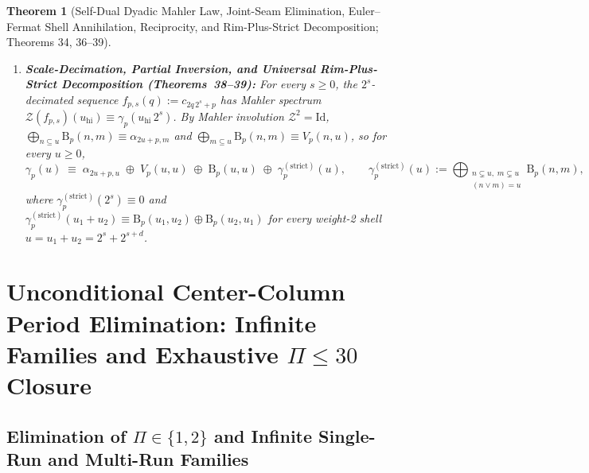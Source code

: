 \documentclass[11pt,a4paper]{article}
\newtheorem{theorem}{Theorem}[section]
\theoremstyle{definition}
\theoremstyle{remark}
\begin{document}
\begin{theorem}[Self-Dual Dyadic Mahler Law, Joint-Seam Elimination, Euler--Fermat Shell Annihilation, Reciprocity, and Rim-Plus-Strict Decomposition; Theorems 34, 36--39]
\begin{enumerate}
  \item \textbf{Scale-Decimation, Partial Inversion, and Universal Rim-Plus-Strict Decomposition (Theorems~38--39):} For every $s \ge 0$, the $2^s$-decimated sequence $f_{p,s}(q) := c_{2q\,2^s + p}$ has Mahler spectrum $\mathcal{Z}(f_{p,s})(u_{\mathrm{hi}}) \equiv \gamma_p(u_{\mathrm{hi}}\,2^s)$. By Mahler involution $\mathcal{Z}^2 = \mathrm{Id}$, $\bigoplus_{n \subseteq u} \mathrm{B}_p(n,m) \equiv \alpha_{2u+p,m}$ and $\bigoplus_{m \subseteq u} \mathrm{B}_p(n,m) \equiv V_p(n,u)$, so for every $u \ge 0$,
  \begin{equation}
    \gamma_p(u) \;\equiv\; \alpha_{2u+p, u} \;\oplus\; V_p(u, u) \;\oplus\; \mathrm{B}_p(u, u) \;\oplus\; \gamma_p^{(\mathrm{strict})}(u), \qquad
    \gamma_p^{(\mathrm{strict})}(u) := \bigoplus_{\substack{n \subsetneq u,\; m \subsetneq u \\ (n \lor m) = u}} \mathrm{B}_p(n, m),
  \end{equation}
  where $\gamma_p^{(\mathrm{strict})}(2^s) \equiv 0$ and $\gamma_p^{(\mathrm{strict})}(u_1 + u_2) \equiv \mathrm{B}_p(u_1,u_2) \oplus \mathrm{B}_p(u_2,u_1)$ for every weight-2 shell $u = u_1 + u_2 = 2^s + 2^{s+d}$.
\end{enumerate}
\end{theorem}

\section{Unconditional Center-Column Period Elimination: Infinite Families and Exhaustive \texorpdfstring{$\Pi \le 30$}{Pi <= 30} Closure}

\subsection{Elimination of \texorpdfstring{$\Pi \in \{1,2\}$}{Pi in \{1,2\}} and Infinite Single-Run and Multi-Run Families}
\end{document}
